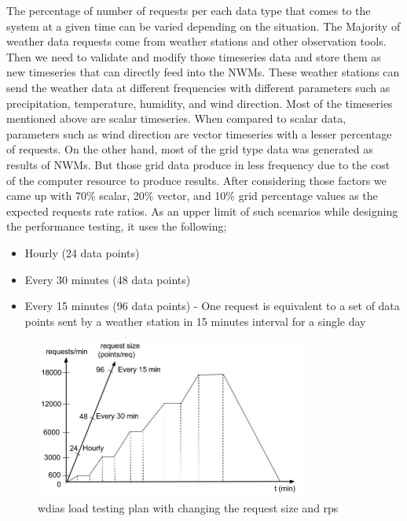 The percentage of number of requests per each data type that comes to the system at a given time can be varied depending on the situation. The Majority of weather data requests come from weather stations and other observation tools. Then we need to validate and modify those timeseries data and store them as new timeseries that can directly feed into the NWMs. These weather stations can send the weather data at different frequencies with different parameters such as precipitation, temperature, humidity, and wind direction. Most of the timeseries mentioned above are scalar timeseries. When compared to scalar data, parameters such as wind direction are vector timeseries with a lesser percentage of requests. On the other hand, most of the grid type data was generated as results of NWMs. But those grid data produce in less frequency due to the cost of the computer resource to produce results. After considering those factors we came up with 70\% scalar, 20\% vector, and 10\% grid percentage values as the expected requests rate ratios.
As an upper limit of such scenarios while designing the performance testing, it uses the following;
\begin{itemize}
    \item Hourly (24 data points)
    \item Every 30 minutes (48 data points)
    \item Every 15 minutes (96 data points) - One request is equivalent to a set of data points sent by a weather station in 15 minutes interval for a single day
\end{itemize}

\begin{figure}[htp]
    \centering
    \includegraphics[width=0.8\textwidth]{results/work_load/performance_study_v4.jpg}
    \caption{\acrshort{wdias} load testing plan with changing the request size and \acrshort{rps}}
    \label{fi:performance_study_load}
\end{figure}

